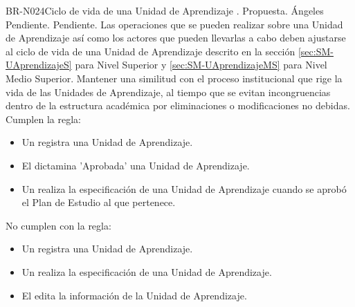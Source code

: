 \begin{BusinessRule}{BR-N024}{Ciclo de vida de una  Unidad de Aprendizaje}
	{\bcAutorization}    %
	{\btEnabler}     %
	{\blControlling}    %
	.
	\BRItem[Estado] Propuesta.
	 Ángeles
	 Pendiente.
	 Pendiente.
	\BRItem[Descripción] Las operaciones que se pueden realizar sobre una Unidad de Aprendizaje así como los actores que pueden llevarlas a cabo deben ajustarse al ciclo de vida de una Unidad de Aprendizaje descrito en la sección \ref{sec:SM-UAprendizajeS} para Nivel Superior y \ref{sec:SM-UAprendizajeMS} para Nivel Medio Superior.
	\BRItem[Motivación] Mantener una similitud con el proceso institucional que rige la vida de las Unidades de Aprendizaje, al tiempo que se evitan incongruencias dentro de la estructura académica por eliminaciones o modificaciones no debidas.
	 Cumplen la regla:
		\begin{itemize}
			\item Un  registra una Unidad de Aprendizaje.
			\item El  dictamina 'Aprobada' una Unidad de Aprendizaje.
			\item Un  realiza la especificación de una Unidad de Aprendizaje cuando se aprobó el Plan de Estudio al que pertenece.
		\end{itemize}
	 No cumplen con la regla:
		\begin{itemize}
			\item Un  registra una Unidad de Aprendizaje.
			\item Un  realiza la especificación de una Unidad de Aprendizaje.
			\item El  edita la información de la Unidad de Aprendizaje.
		\end{itemize}
		
	

\end{BusinessRule}
